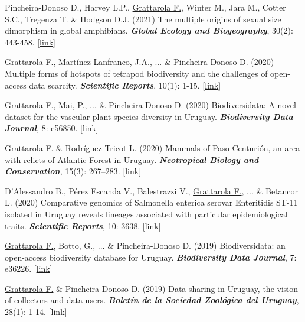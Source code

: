 \begin{etaremune}

\item Pincheira-Donoso D., Harvey L.P., \underline{Grattarola F.}, Winter M., Jara M., Cotter S.C., Tregenza T. \& Hodgson D.J. (2021) The multiple origins of sexual size dimorphism in global amphibians. \textit{\textbf{Global Ecology and Biogeography}}, 30(2): 443-458. [\href{https://doi.org/10.1111/geb.13230}{link}]

\item \underline{Grattarola F.}, Martínez-Lanfranco, J.A., ... \& Pincheira-Donoso D. (2020) Multiple forms of hotspots of tetrapod biodiversity and the challenges of open-access data scarcity. \textit{\textbf{Scientific Reports}}, 10(1): 1-15. [\href{https://doi.org/10.1038/s41598-020-79074-8}{link}]

\item \underline{Grattarola F.}, Mai, P., ... \& Pincheira-Donoso D. (2020) Biodiversidata: A novel dataset for the vascular plant species diversity in Uruguay. \textit{\textbf{Biodiversity Data Journal}}, 8: e56850. [\href{https://doi.org/10.3897/BDJ.8.e56850}{link}]

\item \underline{Grattarola F.} \& Rodríguez-Tricot L. (2020) Mammals of Paso Centurión, an area with relicts of Atlantic Forest in Uruguay. \textit{\textbf{Neotropical Biology and Conservation}}, 15(3): 267–283. [\href{https://doi.org/10.3897/neotropical.15.e53062}{link}]

\item D’Alessandro B., Pérez Escanda V., Balestrazzi V., \underline{Grattarola F.}, ... \& Betancor L.  (2020) Comparative genomics of Salmonella enterica serovar Enteritidis ST-11 isolated in Uruguay reveals lineages associated with particular epidemiological traits. \textit{\textbf{Scientific Reports}}, 10: 3638. [\href{https://doi.org/10.1038/s41598-020-60502-8}{link}]

\item \underline{Grattarola F.}, Botto, G., ... \& Pincheira-Donoso D. (2019) Biodiversidata: an open-access biodiversity database for Uruguay. \textit{\textbf{Biodiversity Data Journal}}, 7: e36226. [\href{https://doi.org/10.3897/BDJ.7.e36226}{link}]

\item \underline{Grattarola F.} \& Pincheira-Donoso D. (2019) Data-sharing in Uruguay, the vision of collectors and data users. \textit{\textbf{Boletín de la Sociedad Zoológica del Uruguay}}, 28(1): 1-14. [\href{https://doi.org/10.26462/28.1.1}{link}]


\end{etaremune}
